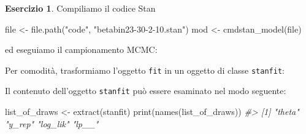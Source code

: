 \documentclass[
  11pt,
]{krantz}
\makeatletter
\newenvironment{Shaded}{\begin{snugshade}}{\end{snugshade}}
\newcommand{\AttributeTok}[1]{\textcolor[rgb]{0.61,0.61,0.61}{#1}}
\newcommand{\CommentTok}[1]{\textcolor[rgb]{0.37,0.37,0.37}{\textit{#1}}}
\newcommand{\DecValTok}[1]{\textcolor[rgb]{0.06,0.06,0.06}{#1}}
\newcommand{\FunctionTok}[1]{\textcolor[rgb]{0,0,0}{#1}}
\newcommand{\NormalTok}[1]{#1}
\newcommand{\OtherTok}[1]{\textcolor[rgb]{0.37,0.37,0.37}{#1}}
\newcommand{\SpecialCharTok}[1]{\textcolor[rgb]{0,0,0}{#1}}
\newcommand{\StringTok}[1]{\textcolor[rgb]{0.5,0.5,0.5}{#1}}
\newenvironment{kframe}{%
\medskip{}
\setlength{\fboxsep}{.8em}
 \def\at@end@of@kframe{}%
 \ifinner\ifhmode%
  \def\at@end@of@kframe{\end{minipage}}%
  \begin{minipage}{\columnwidth}%
 \fi\fi%
 \def\FrameCommand##1{\hskip\@totalleftmargin \hskip-\fboxsep
 \colorbox{shadecolor}{##1}\hskip-\fboxsep
     \hskip-\linewidth \hskip-\@totalleftmargin \hskip\columnwidth}%
 \MakeFramed {\advance\hsize-\width
   \@totalleftmargin\z@ \linewidth\hsize
   \@setminipage}}%
 {\par\unskip\endMakeFramed%
 \at@end@of@kframe}
\renewenvironment{Shaded}{\begin{kframe}}{\end{kframe}}
\theoremstyle{definition}
\theoremstyle{definition}
\theoremstyle{definition}
\newtheorem{exercise}{Esercizio}[chapter]
\theoremstyle{definition}
\theoremstyle{remark}
\makeatother
\begin{document}
\begin{exercise}
\noindent Compiliamo il codice Stan

\begin{Shaded}
\begin{Highlighting}[]
\NormalTok{file }\OtherTok{\textless{}{-}} \FunctionTok{file.path}\NormalTok{(}\StringTok{"code"}\NormalTok{, }\StringTok{"betabin23{-}30{-}2{-}10.stan"}\NormalTok{)}
\NormalTok{mod }\OtherTok{\textless{}{-}} \FunctionTok{cmdstan\_model}\NormalTok{(file)}
\end{Highlighting}
\end{Shaded}

\noindent ed eseguiamo il campionamento MCMC:

\begin{Shaded}
\end{Shaded}

\noindent Per comodità, trasformiamo l'oggetto \texttt{fit} in un oggetto di classe \texttt{stanfit}:

\begin{Shaded}
\end{Shaded}

\noindent Il contenuto dell'oggetto \texttt{stanfit} può essere esaminato nel modo seguente:

\begin{Shaded}
\begin{Highlighting}[]
\NormalTok{list\_of\_draws }\OtherTok{\textless{}{-}} \FunctionTok{extract}\NormalTok{(stanfit)}
\FunctionTok{print}\NormalTok{(}\FunctionTok{names}\NormalTok{(list\_of\_draws))}
\CommentTok{\#\textgreater{} [1] "theta"   "y\_rep"   "log\_lik" "lp\_\_"}
\end{Highlighting}
\end{Shaded}


\end{exercise}
\end{document}
